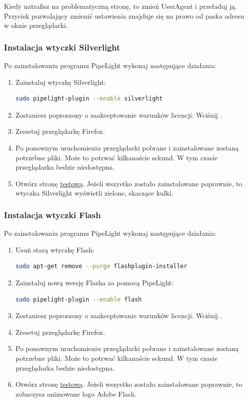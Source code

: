 Kiedy natrafisz na problematyczną stronę, to zmień UserAgent i przeładuj ją. Przycisk pozwalający zmienić ustawienia znajduje się na prawo od paska adresu w oknie przeglądarki.

\subsubsection{Instalacja wtyczki Silverlight}
\noindent Po zainstalowaniu programu PipeLight wykonaj następujące działania:
\begin{enumerate}
\item Zainstaluj wtyczkę Silverlight:
\begin{lstlisting}[language=bash]
sudo pipelight-plugin --enable silverlight
\end{lstlisting}
\item Zostaniesz poproszony o zaakceptowanie warunków licencji. Wciśnij .
\item Zresetuj przeglądarkę Firefox.
\item Po ponownym uruchomieniu przeglądarki pobrane i zainstalowane zostaną potrzebne pliki. Może to potrwać kilkanaście sekund. W tym czasie przeglądarka bedzie niedostępna.
\item Otwórz stronę \href{http://bubblemark.com/silverlight2.html}{testową}. Jeżeli wszystko zostało zainstalowane poprawnie, to wtyczka Silverlight wyświetli zielone, skaczące kulki.
\end{enumerate}

\subsubsection{Instalacja wtyczki Flash}
\noindent Po zainstalowaniu programu PipeLight wykonaj następujące działania:
\begin{enumerate}
\item Usuń starą wtyczkę Flash:
\begin{lstlisting}[language=bash]
sudo apt-get remove --purge flashplugin-installer
\end{lstlisting}
\item Zainstaluj nową wersję Flasha za pomocą PipeLight:
\begin{lstlisting}[language=bash]
sudo pipelight-plugin --enable flash
\end{lstlisting}
\item Zostaniesz poproszony o zaakceptowanie warunków licencji. Wciśnij .
\item Zresetuj przeglądarkę Firefox.
\item Po ponownym uruchomieniu przeglądarki pobrane i zainstalowane zostaną potrzebne pliki. Może to potrwać kilkanaście sekund. W tym czasie przeglądarka bedzie niedostępna.
\item Otwórz stronę \href{https://www.adobe.com/software/flash/about/}{testową}. Jeżeli wszystko zostało zainstalowane poprawnie, to zobaczysz animowane logo Adobe Flash.
\end{enumerate}

